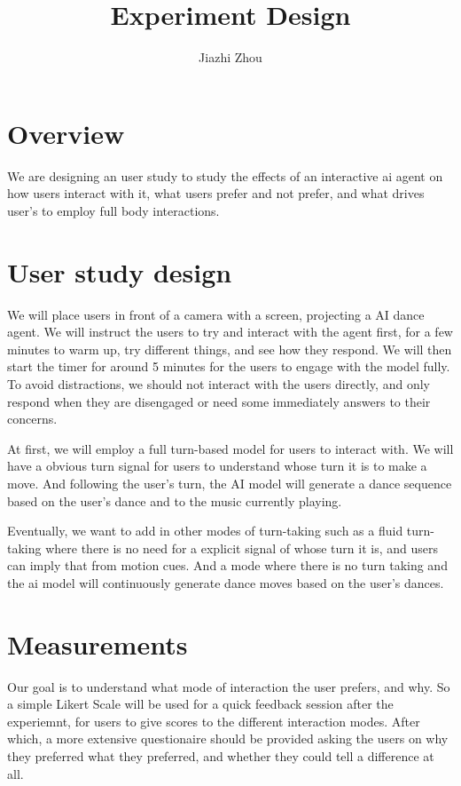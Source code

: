 \documentclass[final,5p,times,twocolumn,authoryear]{article}
\begin{document}
\title{Experiment Design}
\author{Jiazhi Zhou}
\maketitle

\section{Overview}

We are designing an user study to study the effects of an interactive ai
agent on how users interact with it, what users prefer and not prefer,
and what drives user's to employ full body interactions.

\section{User study design}

We will place users in front of a camera with a screen, projecting a AI
dance agent. We will instruct the users to try and interact with the
agent first, for a few minutes to warm up, try different things, and see
how they respond. We will then start the timer for around 5 minutes for
the users to engage with the model fully. To avoid distractions, we
should not interact with the users directly, and only respond when they
are disengaged or need some immediately answers to their concerns.

At first, we will employ a full turn-based model for users to interact
with. We will have a obvious turn signal for users to understand whose
turn it is to make a move. And following the user's turn, the AI model
will generate a dance sequence based on the user's dance and to the
music currently playing.

Eventually, we want to add in other modes of turn-taking such as a fluid
turn-taking where there is no need for a explicit signal of whose turn
it is, and users can imply that from motion cues. And a mode where there
is no turn taking and the ai model will continuously generate dance
moves based on the user's dances.

\section{Measurements}

Our goal is to understand what mode of interaction the user prefers, and
why. So a simple Likert Scale will be used for a quick feedback session
after the experiemnt, for users to give scores to the different
interaction modes. After which, a more extensive questionaire should be
provided asking the users on why they preferred what they preferred, and
whether they could tell a difference at all.
\end{document}
